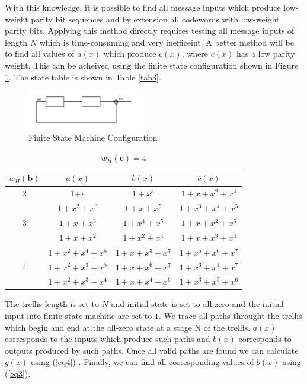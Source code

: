 \documentclass[twocolumn]{article}
\begin{document}
 With this knowledge, it is possible to find all message inputs which produce low-weight parity bit sequences and by extension all codewords  with low-weight parity bits. Applying this method directly requires testing all message inputs of length $N$ which is time-consuming and very inefficeint. A better method will be to find all values of $a(x)$ which produce $c(x)$, where $c(x)$ has a low parity weight. This can be acheived using the finite state configuration shown in Figure \ref{fig2}. The state table is shown in Table \ref{tab3}. 
 
\begin{figure}[h]
\centering
		\includegraphics[width=0.45\textwidth]{fsm.png}
		\caption{Finite State Machine Configuration}
		\label{fig2}
		\end{figure}
		
		
		\begin{table}[h!]
 
 \caption{$w_H(\textbf{c})=4$}
\centering
 \begin{tabular}{c c c c} 
 \hline
 $w_H(\textbf{b})$ & $a(x)$ & $b(x)$ & $c(x)$ \\ [0.5ex] 
 \hline\hline
 2 & 1+x & $1+x^3$ & $1+x+x^2+x^4$\\ 
 \hline 
  & $1+x^2+x^3$ & $1+x+x^5$ & $1+x^3+x^4+x^5$ \\
  3 & $1+x+x^3$& $1+x^4+x^5$ & $1+x+x^2+x^5$ \\
  & $1+x+x^2$& $1+x^2+x^4$& $1+x+x^3+x^4$ \\
  \hline 
  & $1+x^2+x^4+x^5 $ & $1+x+x^3+x^7$ & $1+x^{5}+x^6+x^7$ \\
 4 & $1+x^2+x^3+x^5 $ & $1+x+x^6+x^7$ & $1+x^{3}+x^4+x^7$\\ 
  & $1+x^2+x^3+x^4 $ & $1+x+x^4+x^6$ & $1+x^{3}+x^5+x^6$ \\ [1ex] 
 \hline
 \end{tabular}
 \label{tab2}
\end{table}
		The trellis length is set to $N$ and initial state is set to all-zero and the initial input into finite-state machine are set to $1$.  We trace all paths throught the trellis which begin and end at the all-zero state at a stage N of the trellis. $a(x)$ corresponds to the inputs which produce such paths and $b(x)$ corresponds to outputs produced by such paths. Once all valid paths are found we can calculate $g(x)$ using (\ref{eq4}) . Finally, we can find all corresponding values of $b(x)$ using (\ref{eq3}).
 
\end{document}
